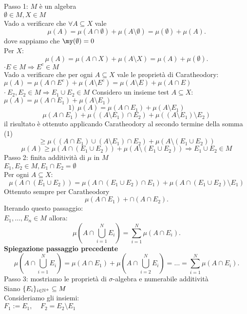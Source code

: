 \documentclass[12px]{article}
\begin{document}
 \begin{dimo}
 	Passo 1: $M$ è un algebra\\
		\cdot $\emptyset\in M, X\in M$\\
	Vado a verificare che $\forall A\subseteq X$ vale
	\[
	\mu(A) = \mu(A\cap \emptyset) + \mu (A\setminus\emptyset) = \mu(\emptyset) + \mu(A)
	.\] 
	dove sappiamo che $\my(\emptyset) = 0$\\
	Per  $X:$
	 \[
	\mu(A) = \mu(A\cap X) + \mu(A\setminus X) = \mu(A) + \mu(\emptyset)
	.\] 
	$\cdot E \in M \Rightarrow  E^c\in M$\\
	Vado a verificare che per ogni $A\subseteq X$ vale le proprietà di Caratheodory:
	$\mu(A) = \mu(A\cap E^c) + \mu (A\setminus E^c) = \mu (A\setminus E ) + \mu(A\cap E)$\\
	$\cdot \ E_2, E_2\in M \Rightarrow E_1\cup E_2\in M$
	Considero un insieme test $A\subseteq X:$\\
	 $\mu(A) = \mu(A\cap E_1) + \mu(A\setminus E_1)$ 
	 \[
	 1)\ \ \mu(A) = \mu(A\cap E_1) + \mu(A\setminus E_1)
	 \] 
	 \[
	  \mu(A\cap E_1) + \mu ((A\setminus E_1)\cap E_2) + \mu((A\setminus E_1)\setminus E_2)
	 \] 
	 il risultato è ottenuto applicando Caratheodory al secondo termine della somma (1)\\
\[
\geq \mu((A\cap E_1)\cup(A\setminus E_1)\cap E_2) + \mu(A\setminus(E_1\cup E_2))
\] 
\[
  \mu(A)\geq \mu(A\cap (E_1\cup E_2)) + \mu (A\setminus (E_1\cup E_2)) \Rightarrow E_1\cup E_2\in M
\] 
Passo 2: finita additività di $\mu$ in $M$\\
 $E_1, E_2\in M, E_1\cap E_2 = \emptyset$\\
 Per ogni $A\subseteq X$:\\
  \[
 \mu(A\cap (E_1\cup E_2)) = \mu(A\cap (E_1\cup E_2)\cap E_1) + \mu (A\cap (E_1\cup E_2)\setminus E_1)
 \] 
 Ottenuto sempre per Caratheodory
 \[
 \mu(A\cap E_1) + \cap (A\cap E_2)
 .\] 
 Iterando questo passaggio:\\
 $E_1, \ldots, E_n\in M$ allora:\\
 \[
	 \mu(A\cap \bigcup^N_{i=1} E_i) = \sum^N_{i=1} \mu (A\cap E_i)
 .\] 
 \textbf{Spiegazione passaggio precedente}
 \[
  \mu (A\cap \bigcup^N_{i=1} E_i) = \mu (A\cap E_1) + \mu (A\cap \bigcup^N_{i=2} E_i) = \ldots = \sum^N_{i=1} \mu (A\cap E_i)
 .\] 
 Passo 3: mostriamo le proprietà di $\sigma$-algebra e numerabile additività\\
 Siano $\{E_i\}_{i\in\mathbb{N}^+}\subseteq M$\\
 Consideriamo gli insiemi:\\
 $F_1:= E_1,\ \ \ \ \  F_2 = E_2\setminus E_1$\\

\end{dimo}
\end{document}

